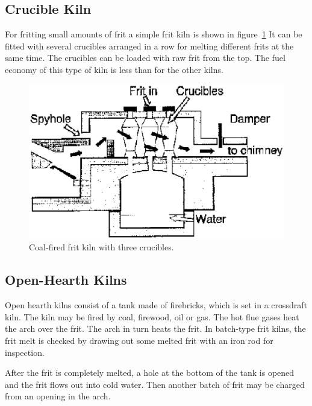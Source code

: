 \subsection{Crucible Kiln}
For fritting small amounts of frit a simple frit kiln is shown in 
figure~\ref{fig:cruciblekiln} It can be fitted with several crucibles arranged 
in a row for melting different frits at the same time. The crucibles can be 
loaded with raw frit from the top. The fuel economy of this type of kiln is 
less than for the other kilns.
\begin{figure}[htbp!]
  \centering
  \includegraphics[width=0.8\linewidth]{img/cruciblekiln.eps}
  \caption{Coal-fired frit kiln with three crucibles.}
  \label{fig:cruciblekiln}
\end{figure}
\subsection{Open-Hearth Kilns}
Open hearth kilns consist of a tank made of firebricks, which is set in a 
crossdraft kiln. The kiln may be fired by coal, firewood, oil or gas. The hot 
flue gases heat the arch over the frit. The arch in turn heats the frit. In 
batch-type frit kilns, the frit melt is checked by drawing out some melted frit 
with an iron rod for inspection.

After the frit is completely melted, a hole at the bottom of the tank is opened 
and the frit flows out into cold water. Then another batch of frit may be 
charged from an opening in the arch.

